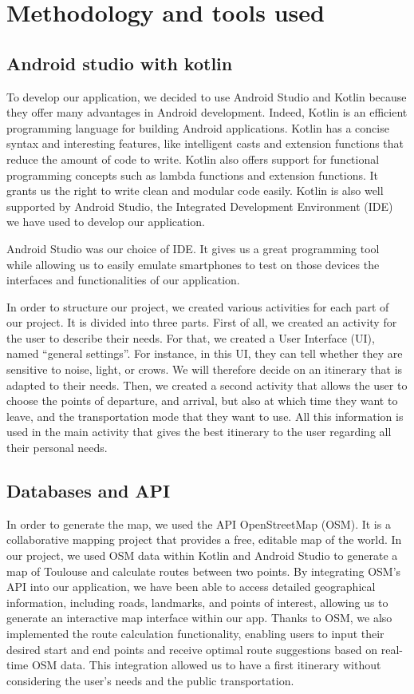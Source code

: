 \section{Methodology and tools used}


\subsection{Android studio with kotlin}


To develop our application, we decided to use Android Studio and Kotlin because they offer many advantages in Android development. Indeed, Kotlin is an efficient programming language for building Android applications. Kotlin has a concise syntax and interesting features, like intelligent casts and extension functions that reduce the amount of code to write. Kotlin also offers support for functional programming concepts such as lambda functions and extension functions. It grants us the right to write clean and modular code easily. Kotlin is also well supported by Android Studio, the Integrated Development Environment (IDE) we have used to develop our application.


Android Studio was our choice of IDE. It gives us a great programming tool while allowing us to easily emulate smartphones to test on those devices the interfaces and functionalities of our application.


In order to structure our project, we created various activities for each part of our project. It is divided into three parts. First of all, we created an activity for the user to describe their needs. For that, we created a User Interface (UI), named “general settings”. For instance, in this UI, they can tell whether they are sensitive to noise, light, or crows. We will therefore decide on an itinerary that is adapted to their needs. Then, we created a second activity that allows the user to choose the points of departure, and arrival, but also at which time they want to leave, and the transportation mode that they want to use. All this information is used in the main activity that gives the best itinerary to the user regarding all their personal needs.


\subsection{Databases and API}


In order to generate the map, we used the API OpenStreetMap (OSM). It is a collaborative mapping project that provides a free, editable map of the world. In our project, we used OSM data within Kotlin and Android Studio to generate a map of Toulouse and calculate routes between two points. By integrating OSM's API into our application, we have been able to access detailed geographical information, including roads, landmarks, and points of interest, allowing us to generate an interactive map interface within our app. Thanks to OSM, we also implemented the route calculation functionality, enabling users to input their desired start and end points and receive optimal route suggestions based on real-time OSM data. This integration allowed us to have a first itinerary without considering the user’s needs and the public transportation.


